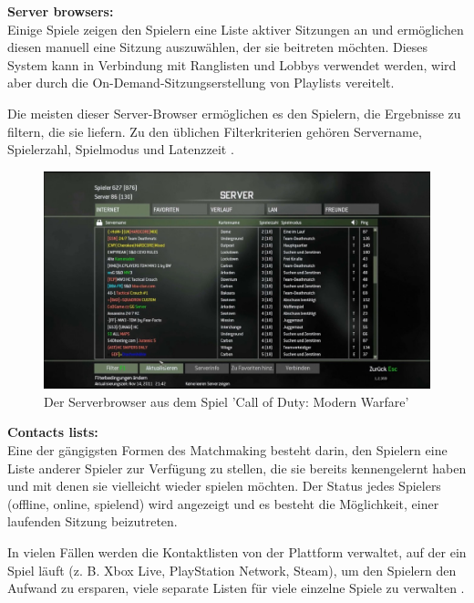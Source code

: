 \textbf{Server browsers:} \\
Einige Spiele zeigen den Spielern eine Liste aktiver Sitzungen an und ermöglichen diesen manuell eine Sitzung auszuwählen, der sie beitreten möchten. Dieses System kann in Verbindung mit Ranglisten und Lobbys verwendet werden, wird aber durch die On-Demand-Sitzungserstellung von Playlists vereitelt.

Die meisten dieser Server-Browser ermöglichen es den Spielern, die Ergebnisse zu filtern, die sie liefern. Zu den üblichen Filterkriterien gehören Servername, Spielerzahl, Spielmodus und Latenzzeit \cite{Wikipedia.2021b}. 

\begin{figure}[H]
	\centering
	\includegraphics[width=120mm]{images/call_of_Duty_serverbrowser.jpg}
	\caption['Call of Duty Modern Warfare' Serverbrowser]{Der Serverbrowser aus dem Spiel 'Call of Duty: Modern Warfare'}
	\label{pic:call_of_Duty_serverbrowser}
\end{figure}

\textbf{Contacts lists:} \\
Eine der gängigsten Formen des Matchmaking besteht darin, den Spielern eine Liste anderer Spieler zur Verfügung zu stellen, die sie bereits kennengelernt haben und mit denen sie vielleicht wieder spielen möchten. Der Status jedes Spielers (offline, online, spielend) wird angezeigt und es besteht die Möglichkeit, einer laufenden Sitzung beizutreten.

In vielen Fällen werden die Kontaktlisten von der Plattform verwaltet, auf der ein Spiel läuft (z. B. Xbox Live, PlayStation Network, Steam), um den Spielern den Aufwand zu ersparen, viele separate Listen für viele einzelne Spiele zu verwalten \cite{Wikipedia.2021b}. 
